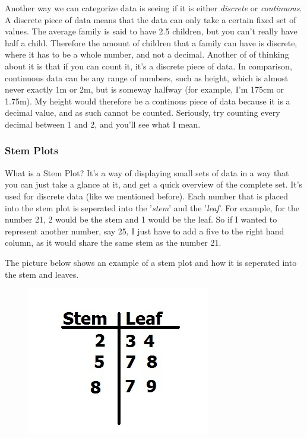 \documentclass[11pt]{article}
\begin{document}
Another way we can categorize data is seeing if it is either \emph{discrete} or \emph{continuous}. A discrete piece of data means that the data can only take a certain fixed set of values. The average family is said to have 2.5 children, but you can't really have half a child. Therefore the amount of children that a family can have is discrete, where it has to be a whole number, and not a decimal. Another of of thinking about it is that if you can count it, it's a discrete piece of data. In comparison, continuous data can be any range of numbers, such as height, which is almost never exactly 1m or 2m, but is someway halfway (for example, I'm 175cm or 1.75m). My height would therefore be a continous piece of data because it is a decimal value, and as such cannot be counted. Seriously, try counting every decimal between 1 and 2, and you'll see what I mean. 

\subsubsection*{Stem Plots}
What is a Stem Plot? It's a way of displaying small sets of data in a way that you can just take a glance at it, and get a quick overview of the complete set. It's used for discrete data (like we mentioned before). Each number that is placed into the stem plot is seperated into the '\emph{stem}' and the '\emph{leaf}'. For example, for the number 21, 2 would be the stem and 1 would be the leaf. So if I wanted to represent another number, say 25, I just have to add a five to the right hand column, as it would share the same stem as the number 21. 

The picture below shows an example of a stem plot and how it is seperated into the stem and leaves.
 
\begin{figure}[htp]
\centering
\includegraphics[scale=1.00]{StemLeafImage1.jpg}
\label{}
\end{figure}
\end{document}
